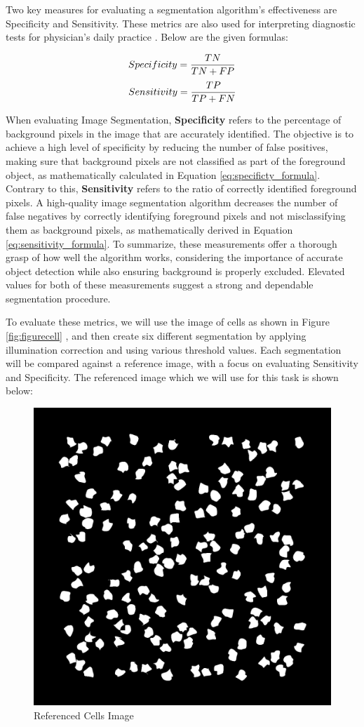 \documentclass[%
	a4paper, %
	12pt, %
	english, %
	bibtotoc %
]{scrartcl}
\begin{document}
Two key measures for evaluating a segmentation algorithm's effectiveness are Specificity and Sensitivity. These metrics are also used for interpreting diagnostic tests for physician's daily practice \cite{van_diagnostic_methods}. Below are the given formulas:

\begin{equation}
    Specificity = \frac{TN}{TN + FP}  \\
    \label{eq:specificty_formula}
\end{equation}
\begin{equation} 
    Sensitivity = \frac{TP}{TP + FN} \\
    \label{eq:sensitivity_formula}
\end{equation}

When evaluating Image Segmentation, \textbf{Specificity} refers to the percentage of background pixels in the image that are accurately identified. The objective is to achieve a high level of specificity by reducing the number of false positives, making sure that background pixels are not classified as part of the foreground object, as mathematically calculated in Equation \ref{eq:specificty_formula}. Contrary to this, \textbf{Sensitivity} refers to the ratio of correctly identified foreground pixels. A high-quality image segmentation algorithm decreases the number of false negatives by correctly identifying foreground pixels and not misclassifying them as background pixels, as mathematically derived in Equation \ref{eq:sensitivity_formula}. To summarize, these measurements offer a thorough grasp of how well the algorithm works, considering the importance of accurate object detection while also ensuring background is properly excluded. Elevated values for both of these measurements suggest a strong and dependable segmentation procedure.

To evaluate these metrics, we will use the image of cells as shown in Figure \ref{fig:figurecell}
, and then create six different segmentation by applying illumination correction and using various threshold values. Each segmentation will be compared against a reference image, with a focus on evaluating Sensitivity and Specificity. The referenced image which we will use for this task is shown below:

\begin{figure}[H]
    \centering
    \includegraphics[width=0.3\linewidth]{cells_reference.png}
    \caption{Referenced Cells Image}
    \label{fig:cells_referenced}
\end{figure}
\end{document}
